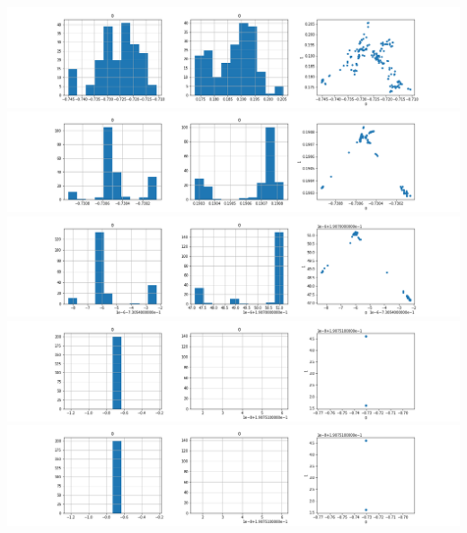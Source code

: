 \documentclass{article}
\begin{document}
\begin{center}

\includegraphics[width=\linewidth]{200_10_0_2_11.png}
\includegraphics[width=\linewidth]{200_10_0_2_21.png}
\includegraphics[width=\linewidth]{200_10_0_2_31.png}
\includegraphics[width=\linewidth]{200_10_0_2_41.png}
\includegraphics[width=\linewidth]{200_10_0_2_51.png}
    
\end{center}
\end{document}
